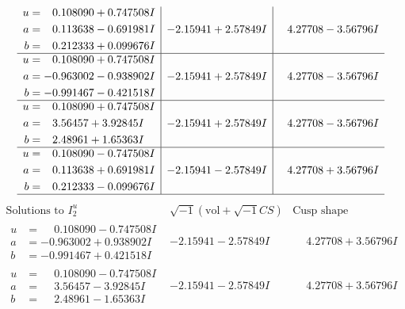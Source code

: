 \documentclass[1p]{elsarticle_modified}
\theoremstyle{definition}
\newcommand{\I}{\sqrt{-1}}
\begin{document}
$$\begin{array}{c|c|c}
\begin{aligned}
u &= \phantom{-}0.108090 + 0.747508 I \\
a &= \phantom{-}0.113638 - 0.691981 I \\
b &= \phantom{-}0.212333 + 0.099676 I\end{aligned}
 & -2.15941 + 2.57849 I & \phantom{-}4.27708 - 3.56796 I \\ \hline\begin{aligned}
u &= \phantom{-}0.108090 + 0.747508 I \\
a &= -0.963002 - 0.938902 I \\
b &= -0.991467 - 0.421518 I\end{aligned}
 & -2.15941 + 2.57849 I & \phantom{-}4.27708 - 3.56796 I \\ \hline\begin{aligned}
u &= \phantom{-}0.108090 + 0.747508 I \\
a &= \phantom{-}3.56457 + 3.92845 I \\
b &= \phantom{-}2.48961 + 1.65363 I\end{aligned}
 & -2.15941 + 2.57849 I & \phantom{-}4.27708 - 3.56796 I \\ \hline\begin{aligned}
u &= \phantom{-}0.108090 - 0.747508 I \\
a &= \phantom{-}0.113638 + 0.691981 I \\
b &= \phantom{-}0.212333 - 0.099676 I\end{aligned}
 & -2.15941 - 2.57849 I & \phantom{-}4.27708 + 3.56796 I\\
 \hline 
 \end{array}$$\newpage$$\begin{array}{c|c|c}  
\text{Solutions to }I^u_{2}& \I (\text{vol} + \sqrt{-1}CS) & \text{Cusp shape}\\
 \hline 
\begin{aligned}
u &= \phantom{-}0.108090 - 0.747508 I \\
a &= -0.963002 + 0.938902 I \\
b &= -0.991467 + 0.421518 I\end{aligned}
 & -2.15941 - 2.57849 I & \phantom{-}4.27708 + 3.56796 I \\ \hline\begin{aligned}
u &= \phantom{-}0.108090 - 0.747508 I \\
a &= \phantom{-}3.56457 - 3.92845 I \\
b &= \phantom{-}2.48961 - 1.65363 I\end{aligned}
 & -2.15941 - 2.57849 I & \phantom{-}4.27708 + 3.56796 I \\ \hline\begin{aligned}

\end{aligned}
\end{array}$$
\end{document}
